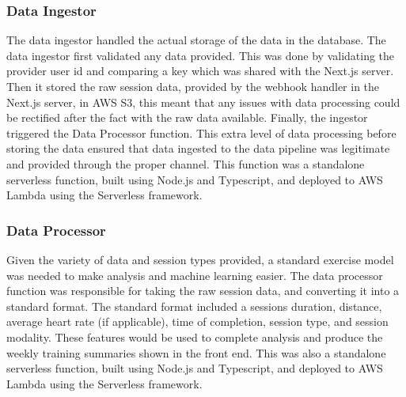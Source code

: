 \subsubsection{Data Ingestor}
The data ingestor handled the actual storage of the data in the database. The data ingestor first validated any data provided. This was done by validating the provider user id and comparing a key which was shared with the Next.js server. Then it stored the raw session data, provided by the webhook handler in the Next.js server, in AWS S3, this meant that any issues with data processing could be rectified after the fact with the raw data available. Finally, the ingestor triggered the Data Processor function. This extra level of data processing before storing the data ensured that data ingested to the data pipeline was legitimate and provided through the proper channel. This function was a standalone serverless function, built using Node.js and Typescript, and deployed to AWS Lambda using the Serverless framework.

\subsubsection{Data Processor}
Given the variety of data and session types provided, a standard exercise model was needed to make analysis and machine learning easier. The data processor function was responsible for taking the raw session data, and converting it into a standard format. The standard format included a sessions duration, distance, average heart rate (if applicable), time of completion, session type, and session modality. These features would be used to complete analysis and produce the weekly training summaries shown in the front end. This was also a standalone serverless function, built using Node.js and Typescript, and deployed to AWS Lambda using the Serverless framework.

